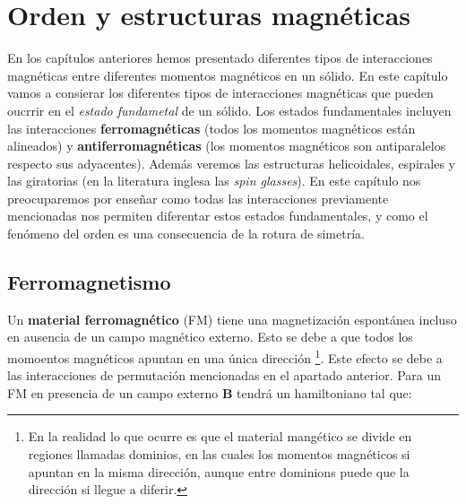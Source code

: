 \documentclass[12pt,a4paper]{book}
\numberwithin{equation}{section}
\numberwithin{figure}{section}
\newcommand{\Bn}{\mathbf{B}}
\begin{document}




\newpage

\chapter{Orden y estructuras magnéticas}

En los capítulos anteriores hemos presentado diferentes tipos de interacciones magnéticas entre diferentes momentos magnéticos en un sólido. En este capítulo vamos a consierar los diferentes tipos de interacciones magnéticas que pueden oucrrir en el \textit{estado fundametal} de un sólido. Los estados fundamentales incluyen las interacciones \textbf{ferromagnéticas} (todos los momentos magnéticos están alineados) y \textbf{antiferromagnéticas} (los momentos magnéticos son antiparalelos respecto sus adyacentes). Además veremos las estructuras helicoidales, espirales y las giratorias (en la literatura inglesa las \textit{spin glasses}). En este capítulo nos preocuparemos por enseñar como todas las interacciones previamente mencionadas nos permiten diferentar estos estados fundamentales, y como el fenómeno del orden es una consecuencia de la rotura de simetría. 

\section{Ferromagnetismo}

Un \textbf{material ferromagnético} (FM) tiene una magnetización espontánea incluso en ausencia de un campo magnético externo. Esto se debe a que todos los momoentos magnéticos apuntan en una única dirección \footnote{En la realidad lo que ocurre es que el material mangético se divide en regiones llamadas dominios, en las cuales los momentos magnéticos si apuntan en la misma dirección, aunque entre dominions puede que la dirección si llegue a diferir.}. Este efecto se debe a las interacciones de permutación mencionadas en el apartado anterior. Para un FM en presencia de un campo externo $\Bn$ tendrá un hamiltoniano tal que:
\end{document}

